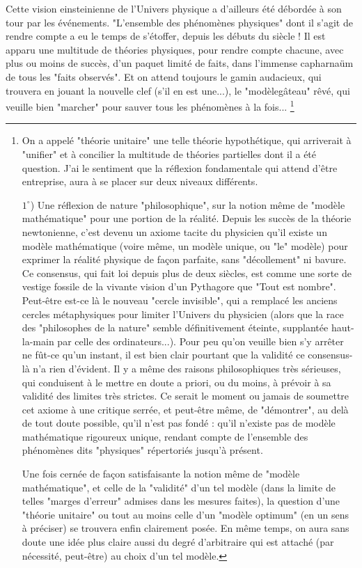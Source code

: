 Cette vision einsteinienne de l'Univers physique a d'ailleurs été débordée à son tour par les événements. "L'ensemble des phénomènes physiques" dont il s'agit de rendre compte a eu le temps de s'étoffer, depuis les débuts du siècle ! Il est apparu une multitude de théories physiques, pour rendre compte chacune, avec plus ou moins de succès, d'un paquet limité de faits, dans l'immense capharnaüm de tous les "faits observés". Et on attend toujours le gamin audacieux, qui trouvera en jouant la nouvelle clef (s'il en est une...), le "modèlegâteau" rêvé, qui veuille bien "marcher" pour sauver tous les phénomènes à la fois... \footnote{On a appelé "théorie unitaire" une telle théorie hypothétique, qui arriverait à "unifier" et à concilier la multitude de théories partielles dont il a été question. J'ai le sentiment que la réflexion fondamentale qui attend d'être entreprise, aura à se placer sur deux niveaux différents.

$1^{\circ}$) Une réflexion de nature "philosophique", sur la notion même de "modèle mathématique" pour une portion de la réalité. Depuis les succès de la théorie newtonienne, c'est devenu un axiome tacite du physicien qu'il existe un modèle mathématique (voire même, un modèle unique, ou "le" modèle) pour exprimer la réalité physique de façon parfaite, sans "décollement" ni bavure. Ce consensus, qui fait loi depuis plus de deux siècles, est comme une sorte de vestige fossile de la vivante vision d'un Pythagore que "Tout est nombre". Peut-être est-ce là le nouveau "cercle invisible", qui a remplacé les anciens cercles métaphysiques pour limiter l'Univers du physicien (alors que la race des "philosophes de la nature" semble définitivement éteinte, supplantée haut-la-main par celle des ordinateurs...). Pour peu qu'on veuille bien s'y arrêter ne fût-ce qu'un instant, il est bien clair pourtant que la validité ce consensus-là n'a rien d'évident. Il y a même des raisons philosophiques très sérieuses, qui conduisent à le mettre en doute a priori, ou du moins, à prévoir à sa validité des limites très strictes. Ce serait le moment ou jamais de soumettre cet axiome à une critique serrée, et peut-être même, de "démontrer", au delà de tout doute possible, qu'il n'est pas fondé : qu'il n'existe pas de modèle mathématique rigoureux unique, rendant compte de l'ensemble des phénomènes dits "physiques" répertoriés jusqu'à présent.

Une fois cernée de façon satisfaisante la notion même de "modèle mathématique", et celle de la "validité" d'un tel modèle (dans la limite de telles "marges d'erreur" admises dans les mesures faites), la question d'une "théorie unitaire" ou tout au moins celle d'un "modèle optimum" (en un sens à préciser) se trouvera enfin clairement posée. En même temps, on aura sans doute une idée plus claire aussi du degré d'arbitraire qui est attaché (par nécessité, peut-être) au choix d'un tel modèle.

}
